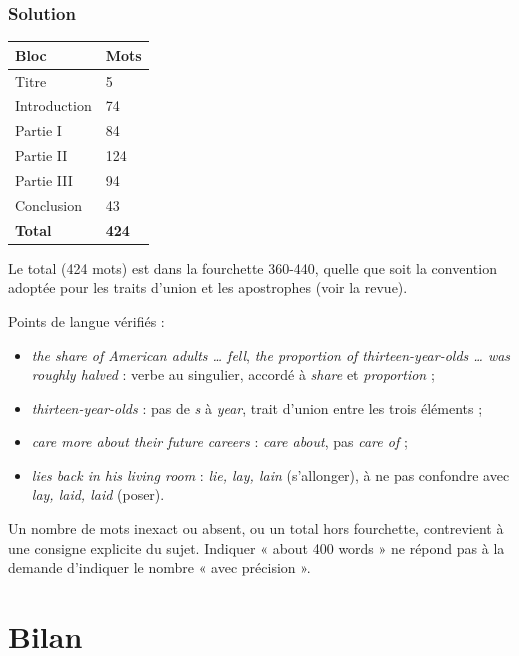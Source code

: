\documentclass[11pt,a4paper]{article}
\providecommand{\tightlist}{\setlength{\itemsep}{0pt}\setlength{\parskip}{0pt}}
\begin{document}
\hypertarget{solution-5}{%
\subsubsection{Solution}\label{solution-5}}

\begin{longtable}[]{@{}ll@{}}
\toprule\noalign{}
Bloc & Mots \\
\midrule\noalign{}
\endhead
\bottomrule\noalign{}
\endlastfoot
Titre & 5 \\
Introduction & 74 \\
Partie I & 84 \\
Partie II & 124 \\
Partie III & 94 \\
Conclusion & 43 \\
\textbf{Total} & \textbf{424} \\
\end{longtable}

Le total (424 mots) est dans la fourchette 360-440, quelle que soit la convention adoptée pour les traits d'union et les apostrophes (voir la revue).

Points de langue vérifiés :

\begin{itemize}
\tightlist
\item
  \emph{the share of American adults \ldots{} fell}, \emph{the proportion of thirteen-year-olds \ldots{} was roughly halved} : verbe au singulier, accordé à \emph{share} et \emph{proportion} ;
\item
  \emph{thirteen-year-olds} : pas de \emph{s} à \emph{year}, trait d'union entre les trois éléments ;
\item
  \emph{care more about their future careers} : \emph{care about}, pas \emph{care of} ;
\item
  \emph{lies back in his living room} : \emph{lie, lay, lain} (s'allonger), à ne pas confondre avec \emph{lay, laid, laid} (poser).
\end{itemize}

\begin{piege}

Un nombre de mots inexact ou absent, ou un total hors fourchette, contrevient à une consigne explicite du sujet. Indiquer « about 400 words » ne répond pas à la demande d'indiquer le nombre « avec précision ».

\end{piege}

\hypertarget{bilan}{%
\section{Bilan}\label{bilan}}
\end{document}
